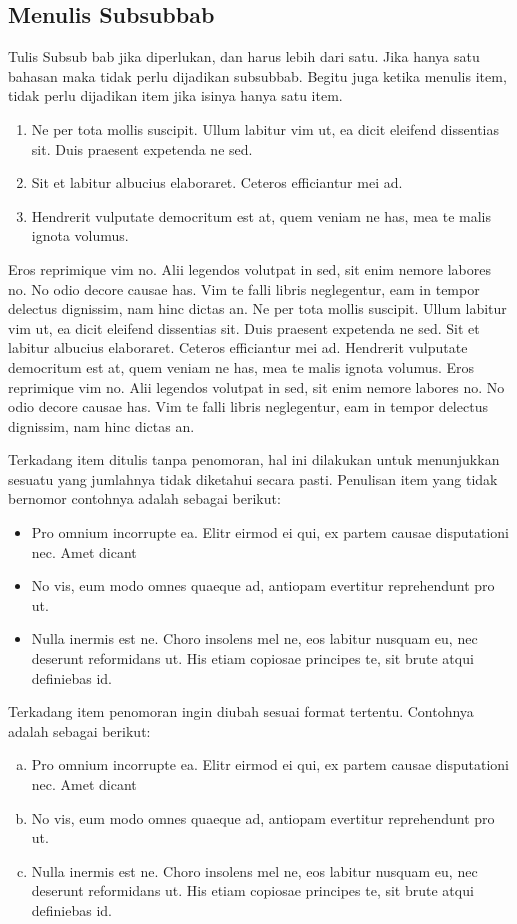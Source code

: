 \subsection{Menulis Subsubbab}
\noindent Tulis Subsub bab jika diperlukan, dan harus lebih dari satu. Jika hanya satu bahasan maka tidak perlu dijadikan subsubbab. Begitu juga ketika menulis item, tidak perlu dijadikan item jika isinya hanya satu item.
\begin{enumerate}
    \item Ne per tota mollis suscipit. Ullum labitur vim ut, ea dicit eleifend dissentias sit. Duis praesent expetenda ne sed.
    \item Sit et labitur albucius elaboraret. Ceteros efficiantur mei ad.
    \item Hendrerit vulputate democritum est at, quem veniam ne has, mea te malis ignota volumus.
\end{enumerate}

Eros reprimique vim no. Alii legendos volutpat in sed, sit enim nemore labores no. No odio decore causae has. Vim te falli libris neglegentur, eam in tempor delectus dignissim, nam hinc dictas an. Ne per tota mollis suscipit. Ullum labitur vim ut, ea dicit eleifend dissentias sit. Duis praesent expetenda ne sed. Sit et labitur albucius elaboraret. Ceteros efficiantur mei ad. Hendrerit vulputate democritum est at, quem veniam ne has, mea te malis ignota volumus. Eros reprimique vim no. Alii legendos volutpat in sed, sit enim nemore labores no. No odio decore causae has. Vim te falli libris neglegentur, eam in tempor delectus dignissim, nam hinc dictas an.

Terkadang item ditulis tanpa penomoran, hal ini dilakukan untuk menunjukkan sesuatu yang jumlahnya tidak diketahui secara pasti. Penulisan item yang tidak bernomor contohnya adalah sebagai berikut:
\begin{itemize}
    \item Pro omnium incorrupte ea. Elitr eirmod ei qui, ex partem causae disputationi nec. Amet dicant
    \item No vis, eum modo omnes quaeque ad, antiopam evertitur reprehendunt pro ut.
    \item Nulla inermis est ne. Choro insolens mel ne, eos labitur nusquam eu, nec deserunt reformidans ut. His etiam copiosae principes te, sit brute atqui definiebas id.
\end{itemize}

Terkadang item penomoran ingin diubah sesuai format tertentu. Contohnya adalah sebagai berikut:
\begin{enumerate}[a).]
    \item Pro omnium incorrupte ea. Elitr eirmod ei qui, ex partem causae disputationi nec. Amet dicant
    \item No vis, eum modo omnes quaeque ad, antiopam evertitur reprehendunt pro ut.
    \item Nulla inermis est ne. Choro insolens mel ne, eos labitur nusquam eu, nec deserunt reformidans ut. His etiam copiosae principes te, sit brute atqui definiebas id.
\end{enumerate}


